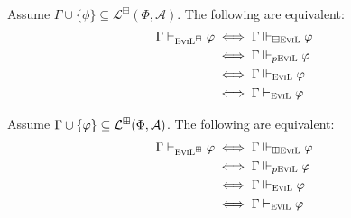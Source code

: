 \begin{theorem}\label{lotsocompleteness}\ \\
\begin{minipage}[b]{0.5\linewidth}
Assume $\Gamma \cup \{\phi\} \subseteq \mathcal{L}^\boxminus(\Phi,\mathcal{A})$. The following are equivalent:
\begin{align*}
\Gamma \vdash_{\textsc{EviL}^\boxminus} \varphi & \iff \Gamma
\Vdash_{\boxminus\textup{\textsc{EviL}}} \varphi \\
 & \iff \Gamma \Vdash_{p\textup{\textsc{EviL}}} \varphi \\
 & \iff \Gamma \Vdash_{\textup{\textsc{EviL}}} \varphi \\
 & \iff \Gamma \vdash_{\textup{\textsc{EviL}}} \varphi
\end{align*}
\end{minipage}
\hspace{0.5cm}
\begin{minipage}[b]{0.5\linewidth}
Assume $\Gamma \cup \{\varphi\} \subseteq \mathcal{L}^\boxplus(\Phi,\mathcal{A})$. The following are equivalent:
\begin{align*}
\Gamma \vdash_{\textsc{EviL}^\boxplus} \varphi & \iff \Gamma
\Vdash_{\boxplus\textup{\textsc{EviL}}} \varphi \\
 & \iff \Gamma \Vdash_{p\textup{\textsc{EviL}}} \varphi \\
 & \iff \Gamma \Vdash_{\textup{\textsc{EviL}}} \varphi \\
 & \iff \Gamma \vdash_{\textup{\textsc{EviL}}} \varphi
\end{align*}
\end{minipage}
\end{theorem}

